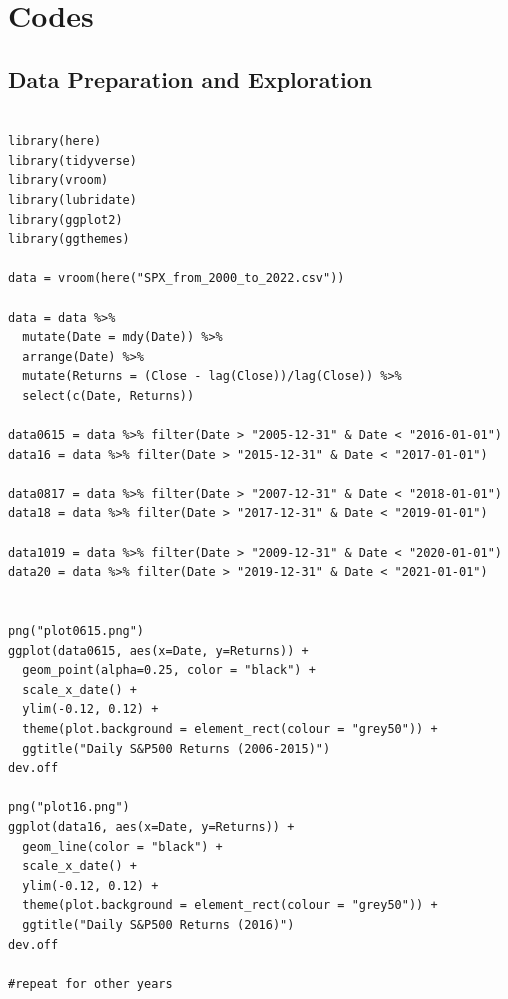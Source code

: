 \documentclass[12pt,letterpaper,reqno,fleqn]{article}
\begin{document}
\newpage

\appendix
\section{Codes}

\subsection{Data Preparation and Exploration}
\begin{verbatim}

library(here)
library(tidyverse)
library(vroom) 
library(lubridate)
library(ggplot2)
library(ggthemes)

data = vroom(here("SPX_from_2000_to_2022.csv"))

data = data %>%
  mutate(Date = mdy(Date)) %>%
  arrange(Date) %>%
  mutate(Returns = (Close - lag(Close))/lag(Close)) %>%
  select(c(Date, Returns)) 

data0615 = data %>% filter(Date > "2005-12-31" & Date < "2016-01-01")
data16 = data %>% filter(Date > "2015-12-31" & Date < "2017-01-01")

data0817 = data %>% filter(Date > "2007-12-31" & Date < "2018-01-01")
data18 = data %>% filter(Date > "2017-12-31" & Date < "2019-01-01")

data1019 = data %>% filter(Date > "2009-12-31" & Date < "2020-01-01")
data20 = data %>% filter(Date > "2019-12-31" & Date < "2021-01-01")


png("plot0615.png")
ggplot(data0615, aes(x=Date, y=Returns)) +
  geom_point(alpha=0.25, color = "black") +
  scale_x_date() +
  ylim(-0.12, 0.12) +
  theme(plot.background = element_rect(colour = "grey50")) +
  ggtitle("Daily S&P500 Returns (2006-2015)")
dev.off

png("plot16.png")
ggplot(data16, aes(x=Date, y=Returns)) +
  geom_line(color = "black") +
  scale_x_date() +
  ylim(-0.12, 0.12) +
  theme(plot.background = element_rect(colour = "grey50")) +
  ggtitle("Daily S&P500 Returns (2016)")
dev.off

#repeat for other years

\end{verbatim}
\end{document}
